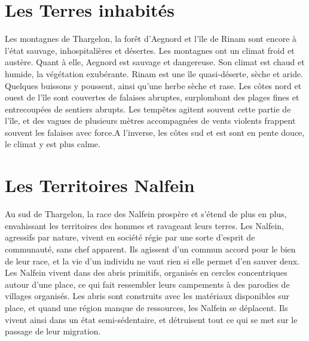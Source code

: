 \section{Les Terres inhabités}
Les montagnes de Thargelon, la forêt d'Aegnord et l'île de Rinam sont encore à l'état sauvage, inhospitalières et désertes. Les montagnes ont un climat froid et austère. Quant à elle, Aegnord est sauvage et dangereuse. Son climat est chaud et humide, la végétation exubérante. 
\newline
Rinam est une île quasi-déserte, sèche et aride. Quelques buissons y poussent, ainsi qu'une herbe sèche et rase. Les côtes nord et ouest de l'île sont couvertes de falaises abruptes, surplombant des plages fines et entrecoupées de sentiers abrupts. Les tempêtes agitent souvent cette partie de l'île, et des vagues de plusieurs mètres accompagnées de vents violents frappent souvent les falaises avec force.A l'inverse, les côtes sud et est sont en pente douce, le climat y est plus calme.
\section{Les Territoires Nalfein}
Au sud de Thargelon, la race des Nalfein prospère et s'étend de plus en plus, envahissant les territoires des hommes et ravageant leurs terres. Les Nalfein, agressifs par nature, vivent en société régie par une sorte d'esprit de communauté, sans chef apparent. Ils agissent d'un commun accord pour le bien de leur race, et la vie d'un individu ne vaut rien si elle permet d'en sauver deux. Les Nalfein vivent dans des abris primitifs, organisés en cercles concentriques autour d'une place, ce qui fait ressembler leurs campements à des parodies de villages organisés. Les abris sont construits avec les matériaux disponibles sur place, et quand une région manque de ressources, les Nalfein se déplacent. Ils vivent ainsi dans un état semi-sédentaire, et détruisent tout ce qui se met sur le passage de leur migration.
